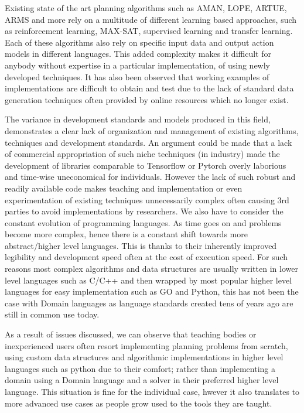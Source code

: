 Existing state of the art planning algorithms such as AMAN, LOPE, ARTUE, ARMS and more \cite{ReviewActionModels:article}
rely on a multitude of different learning based approaches, such as reinforcement learning, MAX-SAT,
supervised learning and transfer learning. Each of these algorithms also rely on specific input
data and output action models in different languages. This added complexity makes it difficult for anybody without
expertise in a particular implementation, of using newly developed techniques. It has also been observed that working
examples of implementations are difficult to obtain and test due to the lack of standard data generation techniques
often provided by online resources which no longer exist.

The variance in development standards and models produced in this field, demonstrates a clear lack of organization and
management of existing algorithms, techniques and development standards.
An argument could be made that a lack of commercial appropriation of such niche techniques
(in industry) made the development of libraries comparable to Tensorflow or Pytorch overly laborious and
time-wise uneconomical for individuals. However the lack of such robust and readily available code makes teaching and
implementation or even experimentation of existing techniques unnecessarily complex often causing 3rd parties to avoid
implementations by researchers. We also have to consider the constant evolution of programming languages.
As time goes on and problems become more complex, hence there is a constant shift towards more abstract/higher level languages.
This is thanks to their inherently improved legibility and development speed often at the cost of execution speed.
For such reasons most complex algorithms and data structures are usually written in lower level languages
such as C/C++ and then wrapped by most popular higher level languages for easy implementation such as GO and Python,
this has not been the case with Domain languages as language standards created tens of years ago are still in common use today.


As a result of issues discussed, we can observe that teaching bodies or inexperienced users often resort implementing
planning problems from scratch, using custom data structures and algorithmic implementations in higher level languages
such as python due to their comfort; rather than implementing a domain using a Domain language and a solver in
their preferred higher level language. This situation is fine for the individual case, hwever it also translates
to more advanced use cases as people grow used to the tools they are taught.

